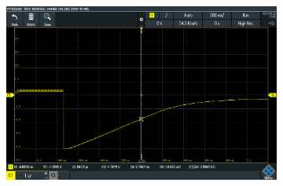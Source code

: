 \begin{figure}
\begin{subfigure}{0.48\columnwidth}
		\label{fig:oscilloscope-raw-p60-d80}
	\end{subfigure}
	\begin{subfigure}{0.48\columnwidth}
		\centering
		\includegraphics[width=0.8\linewidth]{src/figures/oscilloscope-raw/p60-d100.png}
		\label{fig:oscilloscope-raw-p60-d100}
	\end{subfigure}
\end{figure}

